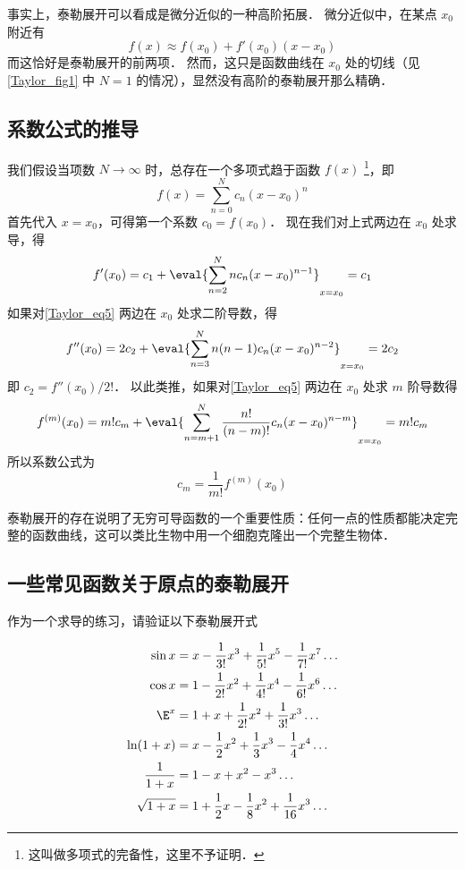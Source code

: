 事实上，泰勒展开可以看成是微分近似的一种高阶拓展． 微分近似中，在某点 $x_0$ 附近有
\begin{equation}
f(x) \approx f({x_0}) + f'({x_0})(x - {x_0})
\end{equation}
而这恰好是泰勒展开的前两项． 然而，这只是函数曲线在 $x_0$ 处的切线（见\autoref{Taylor_fig1} 中 $N=1$ 的情况），显然没有高阶的泰勒展开那么精确． 

\subsection{系数公式的推导}
我们假设当项数 $N \to \infty$ 时，总存在一个多项式趋于函数 $f(x)$ \footnote{这叫做多项式的完备性，这里不予证明．}，即
\begin{equation}\label{Taylor_eq5}
f(x) = \sum_{n = 0}^N  c_n (x - x_0)^n
\end{equation}
首先代入 $x = x_0$，可得第一个系数 $c_0 = f(x_0)$． 现在我们对上式两边在 $x_0$ 处求导，得
\begin{equation}
f'(x_0) = c_1 + \eval{ \sum_{n = 2}^N n c_n (x - x_0)^{n - 1} }_{x = x_0}  = c_1
\end{equation}
如果对\autoref{Taylor_eq5} 两边在 $x_0$ 处求二阶导数，得
\begin{equation}
f''(x_0) = 2 c_2 + \eval{ \sum_{n = 3}^N  n(n - 1) c_n (x - x_0)^{n - 2} }_{x = x_0}  = 2 c_2
\end{equation}
即 ${c_2} = f''({x_0})/2!$．  以此类推，如果对\autoref{Taylor_eq5} 两边在 $x_0$ 处求 $m$ 阶导数得
\begin{equation}
f^{(m)}(x_0) = m! c_m + \eval{ \sum_{n = m + 1}^N  \frac{{n!}}{{(n - m)!}} c_n (x - x_0)^{n - m} }_{x = x_0}  = m! c_m
\end{equation}
所以系数公式为
\begin{equation}
{c_m} = \frac{1}{{m!}}{f^{(m)}}(x_0)
\end{equation}

泰勒展开的存在说明了无穷可导函数的一个重要性质：任何一点的性质都能决定完整的函数曲线，这可以类比生物中用一个细胞克隆出一个完整生物体．

\subsection{一些常见函数关于原点的泰勒展开}
作为一个求导的练习，请验证以下泰勒展开式

\begin{align}
\sin x &= x - \frac{1}{{3!}}{x^3} + \frac{1}{{5!}}{x^5} - \frac{1}{7!}x^7 \ldots\\
\cos x &= 1 - \frac{1}{2!}{x^2} + \frac{1}{4!}{x^4} -\frac{1}{6!}x^6 \ldots\\
\E^x &=1 + x + \frac{1}{2!}x^2 + \frac{1}{3!}x^3  \ldots\\
\ln (1+x) &= x - \frac 12 x^2 + \frac 13 x^3 - \frac 14 x^4 \ldots\\
\frac{1}{1+x} &= 1 - x + x^2 - x^3 \ldots\\
\sqrt{1+x} &= 1 + \frac 12 x - \frac 18 x^2 + \frac{1}{16} x^3 \ldots
\end{align}



